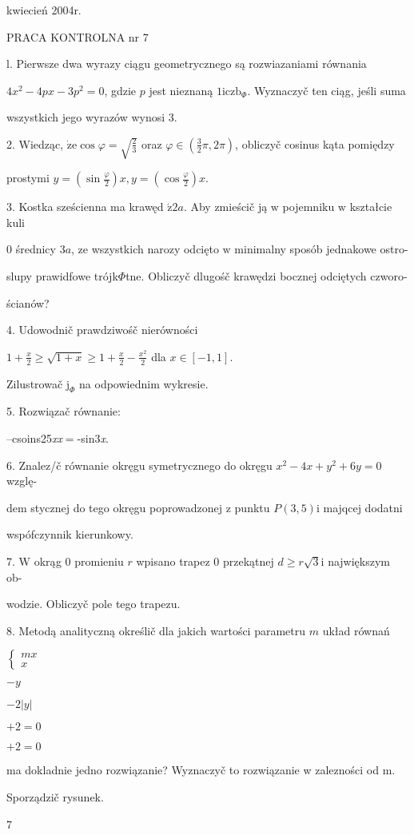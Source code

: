 \documentclass[a4paper,12pt]{article}
\begin{document}
kwiecień 2004r.

PRACA KONTROLNA nr 7

l. Pierwsze dwa wyrazy ciągu geometrycznego są rozwiazaniami równania

$4x^{2}-4px-3p^{2}=0$, gdzie $p$ jest nieznaną $1\mathrm{i}\mathrm{c}\mathrm{z}\mathrm{b}_{\Phi}$. Wyznaczyč ten ciąg, jeśli suma

wszystkich jego wyrazów wynosi 3.

2. Wiedząc, $\dot{\mathrm{z}}\mathrm{e} \cos\varphi = \sqrt{\frac{2}{3}}$ oraz $\varphi \in (\displaystyle \frac{3}{2}\pi,2\pi)$, obliczyč cosinus kąta pomiędzy

prostymi $y=(\displaystyle \sin\frac{\varphi}{2})x, y=(\displaystyle \cos\frac{\varphi}{2})x.$

3. Kostka sześcienna ma krawęd $\acute{\mathrm{z}} 2a$. Aby zmieścič ją $\mathrm{w}$ pojemniku $\mathrm{w}$ kształcie kuli

$0$ średnicy $3a$, ze wszystkich narozy odcięto $\mathrm{w}$ minimalny sposób jednakowe ostro-

slupy prawidfowe trójk$\Phi$tne. Obliczyč dlugośč krawędzi bocznej odciętych czworo-

ścianów?

4. Udowodnič prawdziwośč nierówności

$1+\displaystyle \frac{x}{2}\geq\sqrt{1+x}\geq 1+\frac{x}{2}-\frac{x^{2}}{2}$ dla $x\in[-1,1].$

Zilustrowač $\mathrm{j}_{\Phi}$ na odpowiednim wykresie.

5. Rozwiązač równanie:

--csoins25{\it xx}$=$-sin3{\it x}.

6. Znalez/č równanie okręgu symetrycznego do okręgu $x^{2}-4x+y^{2}+6y=0$ wzglę-

dem stycznej do tego okręgu poprowadzonej $\mathrm{z}$ punktu $P(3,5) \mathrm{i}$ majqcej dodatni

wspófczynnik kierunkowy.

7. $\mathrm{W}$ okrąg $0$ promieniu $r$ wpisano trapez $0$ przekątnej $d\geq r\sqrt{3}\mathrm{i}$ największym ob-

wodzie. Obliczyč pole tego trapezu.

8. Metodą analityczną określič dla jakich wartości parametru $m$ układ równań

$\left\{\begin{array}{l}
mx\\
x
\end{array}\right.$

$-y$

$-2|y|$

$+2=0$

$+2=0$

ma dokladnie jedno rozwiązanie? Wyznaczyč to rozwiązanie w zalezności od m.

Sporządzič rysunek.

7
\end{document}
